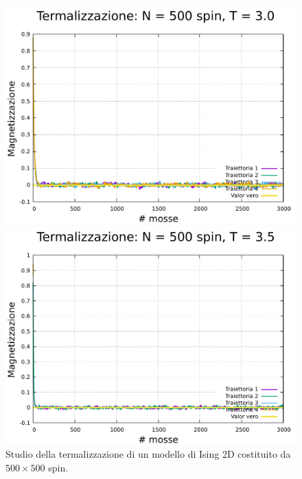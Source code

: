 \begin{figure}[htbp]
    \begin{minipage}{0.45\textwidth}  
      \centering
      \includegraphics[page=1, width=\textwidth]{Immagini/simIsing2D/metro/term/term_500_3.0.pdf}
      \caption{$T\,=\,3.0$}
    \end{minipage}\hfill
    \begin{minipage}{0.45\textwidth}  
      \centering
      \includegraphics[page=1, width=\textwidth]{Immagini/simIsing2D/metro/term/term_500_3.5.pdf}
      \caption{$T\,=\,3.5$}
    \end{minipage}
    \caption{Studio della termalizzazione di un modello di Ising 2D costituito da $500 \times 500$ spin.}
\end{figure}


